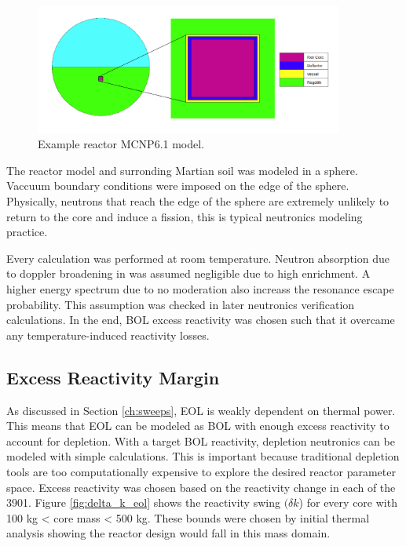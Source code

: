\begin{figure}[h]
    \centering
    \includegraphics[width=4in]{../images/crit_model_geom.png}
\caption{Example reactor MCNP6.1 model.}
\label{fig:homog_model}
\end{figure}

The reactor model and surronding Martian soil was modeled in a sphere. Vaccuum
boundary conditions were imposed on the edge of the sphere. Physically, neutrons
that reach the edge of the sphere are extremely unlikely to return to the core
and induce a fission, this is typical neutronics modeling practice.

Every \keff calculation was performed at room temperature. Neutron absorption
due to doppler broadening in 
\urantwo was assumed negligible due to high enrichment. A higher energy
spectrum due to no moderation also increass the resonance escape probability.
This assumption was checked in later neutronics verification calculations. 
In the end, BOL excess reactivity was chosen such that it overcame any 
temperature-induced reactivity losses. 

\subsection{Excess Reactivity Margin}
As discussed in Section \ref{ch:sweeps}, EOL \keff is weakly dependent on
thermal power. This means that EOL \keff can be modeled as BOL \keff with enough
excess reactivity to account for depletion. With a target BOL reactivity,
depletion neutronics can be modeled with simple \keff calculations. This
is important because traditional depletion tools are too computationally
expensive to explore the desired reactor parameter space. Excess reactivity was
chosen based on the reactivity change in each of the 3901. Figure
\ref{fig:delta_k_eol} shows the reactivity swing $(\delta k$) for every core
with 100 kg < core mass < 500 kg. These bounds were chosen by initial thermal analysis
showing the reactor design would fall in this mass domain.

